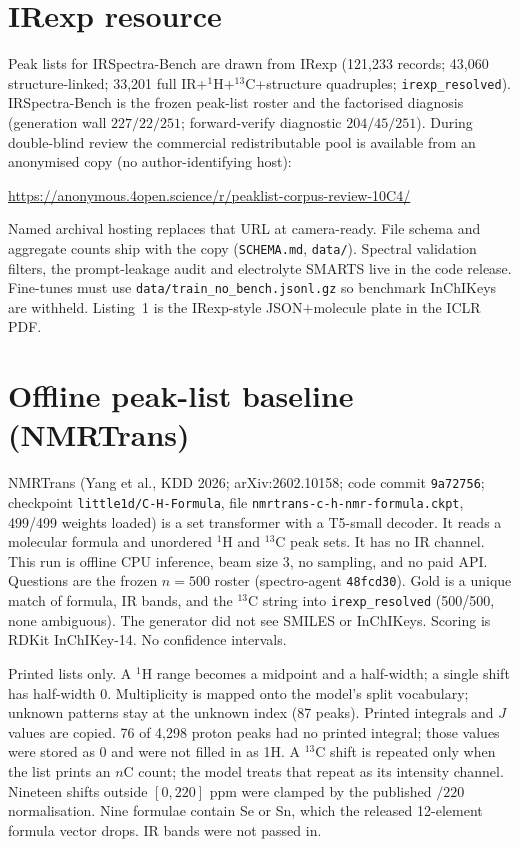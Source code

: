 \documentclass[11pt]{article}
\begin{document}
\section{IRexp resource}
\label{si:split}

Peak lists for IRSpectra-Bench are drawn from IRexp (121,233 records;
43,060 structure-linked; 33,201 full IR+$^1$H+$^{13}$C+structure
quadruples; \texttt{irexp\_resolved}).
IRSpectra-Bench is the frozen peak-list roster and the factorised
diagnosis (generation wall $227/22/251$; forward-verify diagnostic
$204/45/251$).
During double-blind review the commercial redistributable pool is
available from an anonymised copy (no author-identifying host):
\begin{center}
\url{https://anonymous.4open.science/r/peaklist-corpus-review-10C4/}
\end{center}
Named archival hosting replaces that URL at camera-ready.
File schema and aggregate counts ship with the copy
(\texttt{SCHEMA.md}, \texttt{data/}).
Spectral validation filters, the prompt-leakage audit and electrolyte
SMARTS live in the code release.
Fine-tunes must use \texttt{data/train\_no\_bench.jsonl.gz} so benchmark
InChIKeys are withheld.
Listing~1 is the IRexp-style JSON$+$molecule plate in the ICLR PDF.

\section{Offline peak-list baseline (NMRTrans)}
\label{si:nmrtrans}

NMRTrans (Yang et al., KDD 2026; arXiv:2602.10158;
code commit \texttt{9a72756}; checkpoint
\texttt{little1d/C-H-Formula}, file
\texttt{nmrtrans-c-h-nmr-formula.ckpt}, 499/499 weights loaded)
is a set transformer with a T5-small decoder.
It reads a molecular formula and unordered $^1$H and $^{13}$C peak sets.
It has no IR channel.
This run is offline CPU inference, beam size 3, no sampling, and no paid API.
Questions are the frozen $n{=}500$ roster
(spectro-agent \texttt{48fcd30}).
Gold is a unique match of formula, IR bands, and the $^{13}$C string
into \texttt{irexp\_resolved} (500/500, none ambiguous).
The generator did not see SMILES or InChIKeys.
Scoring is RDKit InChIKey-14.
No confidence intervals.

Printed lists only.
A $^1$H range becomes a midpoint and a half-width; a single shift has
half-width 0.
Multiplicity is mapped onto the model's split vocabulary; unknown
patterns stay at the unknown index (87 peaks).
Printed integrals and $J$ values are copied.
76 of 4,298 proton peaks had no printed integral; those values were
stored as 0 and were not filled in as 1H.
A $^{13}$C shift is repeated only when the list prints an $n$C count;
the model treats that repeat as its intensity channel.
Nineteen shifts outside $[0,220]$ ppm were clamped by the published
$/220$ normalisation.
Nine formulae contain Se or Sn, which the released 12-element formula
vector drops.
IR bands were not passed in.
\end{document}
